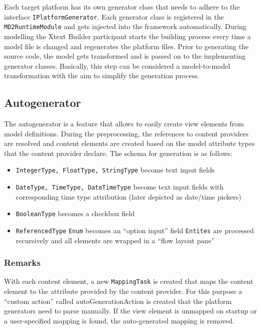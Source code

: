 

Each target platform has its own generator class that needs to adhere to the interface  \lstinline|IPlatformGenerator|. Each generator class is registered in the \lstinline|MD2RuntimeModule| and gets injected into the framework automatically. During modelling the Xtext Builder participant starts the building process every time a model file is changed and regenerates the platform files.
Prior to generating the source code, the model gets transformed and is passed on to the implementing generator classes. Basically, this step can be considered a model-to-model transformation with the aim to simplify the generation process.

\subsection{Autogenerator}
The autogenerator is a feature that allows to easily create view elements from model definitions. During the preprocessing, the references to content providers are resolved and content elements are created based on the model attribute types that the content provider declare. The schema for generation is as follows:

\begin{itemize}
	\item \lstinline!IntegerType, FloatType, StringType! become text input fields
	\item \lstinline!DateType, TimeType, DateTimeType! become text input fields with corresponding time type attribution (later depicted as date/time pickers)
	\item \lstinline!BooleanType! becomes a checkbox field
	\item \lstinline!ReferencedType!
		\subitem \lstinline!Enum! becomes an \enquote{option input} field
		\subitem \lstinline!Entites! are processed recursively and all elements are wrapped in a \enquote{flow layout pane}
\end{itemize}

\subsubsection{Remarks}
With each content element, a new \lstinline!MappingTask! is created that maps the content element to the attribute provided by the content provider. For this purpose a \enquote{custom action} called autoGenerationAction is created that the platform generators need to parse manually. If the view element is unmapped on startup or a user-specified mapping is found, the auto-generated mapping is removed.

